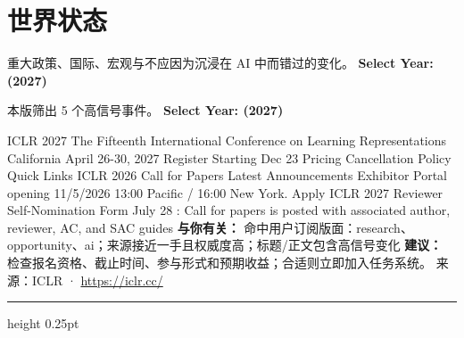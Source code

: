 \documentclass[10.5pt]{ctexart}
\begin{document}
\section*{世界状态}
{\color{ormuted} 重大政策、国际、宏观与不应因为沉浸在 AI 中而错过的变化。}
\vspace{2mm}
{\LARGE\bfseries Select Year: (2027)}\par
\vspace{1mm}
{\color{ormuted} 本版筛出 5 个高信号事件。}
\vspace{3mm}
{\Large\bfseries Select Year: (2027)}\par
ICLR 2027 The Fifteenth International Conference on Learning Representations California April 26-30, 2027 Register Starting Dec 23 Pricing Cancellation Policy Quick Links ICLR 2026 Call for Papers Latest Announcements Exhibitor Portal opening 11/5/2026 13:00 Pacific / 16:00 New York. Apply ICLR 2027 Reviewer Self-Nomination Form July 28 : Call for papers is posted with associated author, reviewer, AC, and SAC guides 
\textbf{与你有关：} 命中用户订阅版面：research、opportunity、ai；来源接近一手且权威度高；标题/正文包含高信号变化
\textbf{建议：} 检查报名资格、截止时间、参与形式和预期收益；合适则立即加入任务系统。
{\footnotesize\color{ormuted} 来源：ICLR · \url{https://iclr.cc/}}
\vspace{4mm}
\hrule height 0.25pt
\vspace{3mm}
\end{document}
